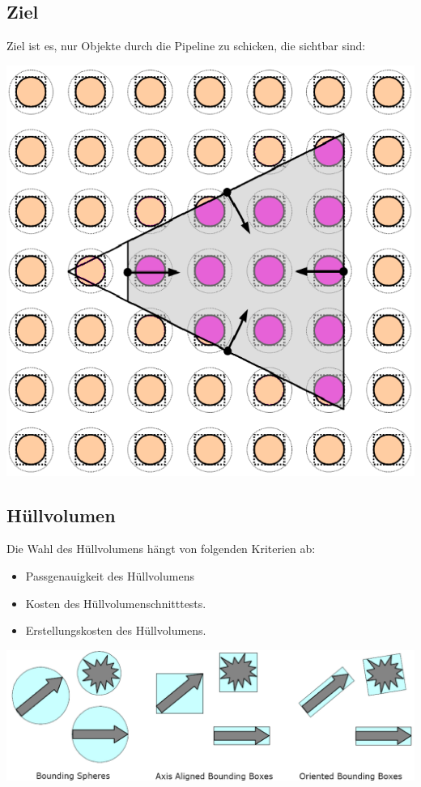 \documentclass[10pt]{article}
\begin{document}
\subsection{Ziel}
Ziel ist es, nur Objekte durch die Pipeline zu schicken, die sichtbar sind:
\begin{center}
	\includegraphics[scale=0.2]{frustum_culling.png}
\end{center}
\subsection{Hüllvolumen}
Die Wahl des Hüllvolumens hängt von folgenden Kriterien ab:
\begin{itemize}
	\item Passgenauigkeit des Hüllvolumens
	\item Kosten des Hüllvolumenschnitttests. 
	\item Erstellungskosten des Hüllvolumens.
\end{itemize}
\begin{center}
	\includegraphics[scale=0.3]{huellvolumen.png}
\end{center}
\end{document}
